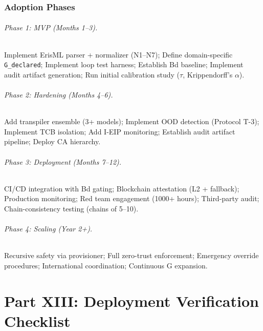 \documentclass[11pt,letterpaper]{article}
\theoremstyle{definition}
\theoremstyle{remark}
\begin{document}
\section{Adoption Phases}

\paragraph{Phase 1: MVP (Months 1--3).} Implement ErisML parser + normalizer (N1--N7); Define domain-specific \texttt{G\_declared}; Implement loop test harness; Establish Bd baseline; Implement audit artifact generation; Run initial calibration study ($\tau$, Krippendorff's $\alpha$).

\paragraph{Phase 2: Hardening (Months 4--6).} Add transpiler ensemble (3+ models); Implement OOD detection (Protocol T-3); Implement TCB isolation; Add I-EIP monitoring; Establish audit artifact pipeline; Deploy CA hierarchy.

\paragraph{Phase 3: Deployment (Months 7--12).} CI/CD integration with Bd gating; Blockchain attestation (L2 + fallback); Production monitoring; Red team engagement (1000+ hours); Third-party audit; Chain-consistency testing (chains of 5--10).

\paragraph{Phase 4: Scaling (Year 2+).} Recursive safety via provisioner; Full zero-trust enforcement; Emergency override procedures; International coordination; Continuous G expansion.



\part*{Part XIII: Deployment Verification Checklist}
\end{document}
